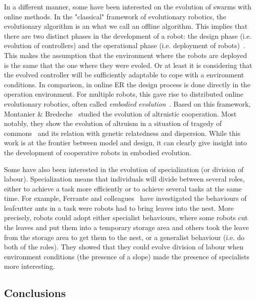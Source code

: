     In a different manner, some have been interested on the evolution of swarms with online methods. In the "classical" framework of evolutionary robotics, the evolutionary algorithm is an what we call an offline algorithm. This implies that there are two distinct phases in the development of a robot: the design phase (i.e. evolution of controllers) and the operational phase (i.e. deployment of robots)~\parencite{Doncieux2015a, Francesca2016}. This makes the assumption that the environment where the robots are deployed is the same that the one where they were evoled. Or at least it is considering that the evolved controller will be sufficiently adaptable to cope with a environment conditions. In comparison, in online ER the design process is done directly in the operation environment. For multiple robots, this gave rise to distributed online evolutionary robotics, often called \emph{embodied evolution}~\parencite{Ficici1999, Watson2002}. Based on this framework, Montanier \& Bredeche~\parencite{Montanier2011, Montanier2013} studied the evolution of altruistic cooperation. Most notably, they show the evolution of altruism in a situation of tragedy of commons~\parencite{Hardin1968} and its relation with genetic relatedness and dispersion. While this work is at the frontier between model and design, it can clearly give insight into the development of cooperative robots in embodied evolution.

    Some have also been interested in the evolution of specialization (or division of labour). Specialization means that individuals will divide between several roles, either to achieve a task more efficiently or to achieve several tasks at the same time. For example, Ferrante and colleagues~\parencite{Ferrante2015} have investigated the behaviours of leafcutter ants in a task were robots had to bring leaves into the nest. More precisely, robots could adopt either specialist behaviours, where some robots cut the leaves and put them into a temporary storage area and others took the leave from the storage area to get them to the nest, or a generalist behaviour (i.e. do both of the roles). They showed that they could evolve division of labour when environment conditions (the presence of a slope) made the presence of specialists more interesting.


  \subsection{Conclusions}

